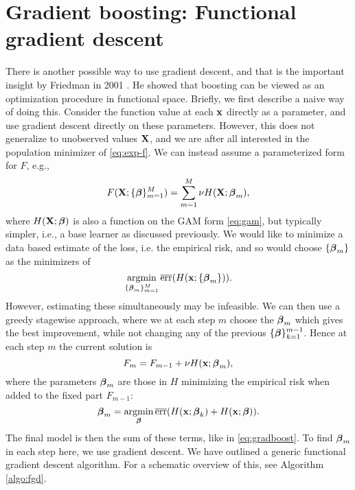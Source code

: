 \section{Gradient boosting: Functional gradient descent}
There is another possible way to use gradient descent, and that is the important insight by Friedman in 2001 \citep{friedman2001}. He showed that boosting can be viewed as an optimization procedure in functional space. Briefly, we first describe a naive way of doing this. Consider the function value at each $\mathbf{x}$ directly as a parameter, and use gradient descent directly on these parameters. However, this does not generalize to unobserved values $\mathbf{X}$, and we are after all interested in the population minimizer of \eqref{eq:exp-f}. We can instead assume a parameterized form for $F$, e.g.,
\begin{equation}\label{eq:gradboost}
    F(\mathbf{X};\{\boldsymbol{\beta}\}_{m=1}^M)=\sum_{m=1}^M\nu H(\mathbf{X};\boldsymbol{\beta}_m),
\end{equation}
where $H(\mathbf{X};\boldsymbol{\beta})$ is also a function on the GAM form \eqref{eq:gam}, but typically simpler, i.e., a base learner as discussed previously. We would like to minimize a data based estimate of the loss, i.e. the empirical risk, and so would choose $\{\boldsymbol{\beta}_m\}$ as the minimizers of 
\begin{equation*}
    \operatorname*{argmin}_{\{\boldsymbol{\beta}_m\}_{m=1}^M}\overline{\text{err}}(H(\mathbf{x};\{\boldsymbol{\beta}_m\})).
\end{equation*}
However, estimating these simultaneously may be infeasible. We can then use a greedy stagewise approach, where we at each step $m$ choose the $\boldsymbol{\beta}_m$ which gives the best improvement, while not changing any of the previous $\{\boldsymbol{\beta}\}_{k=1}^{m-1}$. Hence at each step $m$ the current solution is
\begin{equation*}
    F_{m}=F_{m-1}+\nu H(\mathbf{x};\boldsymbol{\beta}_m),
\end{equation*}
where the parameters $\boldsymbol{\beta}_m$ are those in $H$ minimizing the empirical risk when added to the fixed part $F_{m-1}$:
\begin{equation*}
    \boldsymbol{\beta}_m=\operatorname*{argmin}_{\boldsymbol{\beta}}\overline{\text{err}}(H(\mathbf{x};\boldsymbol{\beta}_k)+H(\mathbf{x};\boldsymbol{\beta})).
\end{equation*}
The final model is then the sum of these terms, like in \eqref{eq:gradboost}. To find $\boldsymbol{\beta}_m$ in each step here, we use gradient descent. We have outlined a generic functional gradient descent algorithm. For a schematic overview of this, see Algorithm \ref{algo:fgd}.
